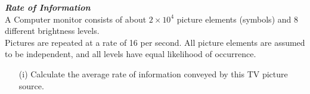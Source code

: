 \item[(b)] \textbf{\textit{Rate of Information}}\\
A Computer monitor consists of about $2 \times 10^4$ picture elements (symbols) and 8
different brightness levels.\\
\newline
Pictures are repeated at a rate of 16 per second. All picture elements
are assumed to be independent, and all levels have equal likelihood of occurrence. 
\begin{itemize}
\item[(i)] Calculate the
average rate of information conveyed by this TV picture source.
\end{itemize}



